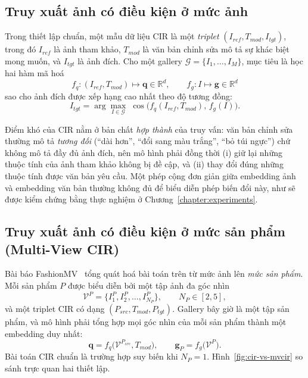 \subsection{Truy xuất ảnh có điều kiện ở mức ảnh}

Trong thiết lập chuẩn, một mẫu dữ liệu CIR là một \emph{triplet} $(I_{ref}, T_{mod}, I_{tgt})$, trong đó $I_{ref}$ là ảnh tham khảo, $T_{mod}$ là văn bản chỉnh sửa mô tả sự khác biệt mong muốn, và $I_{tgt}$ là ảnh đích. Cho một gallery $\mathcal{G} = \{I_1, \dots, I_M\}$, mục tiêu là học hai hàm mã hoá
\begin{equation}
    f_q : (I_{ref}, T_{mod}) \mapsto \mathbf{q} \in \mathbb{R}^d, \qquad f_g : I \mapsto \mathbf{g} \in \mathbb{R}^d
\end{equation}
sao cho ảnh đích được xếp hạng cao nhất theo độ tương đồng:
\begin{equation}
    I_{tgt} = \arg\max_{I \in \mathcal{G}} \; \cos\big(f_q(I_{ref}, T_{mod}),\, f_g(I)\big).
    \label{eq:cir-objective}
\end{equation}

Điểm khó của CIR nằm ở bản chất \emph{hợp thành} của truy vấn: văn bản chỉnh sửa thường mô tả \emph{tương đối} (``dài hơn'', ``đổi sang màu trắng'', ``bỏ túi ngực'') chứ không mô tả đầy đủ ảnh đích, nên mô hình phải đồng thời (i) giữ lại những thuộc tính của ảnh tham khảo không bị đề cập, và (ii) thay đổi đúng những thuộc tính được văn bản yêu cầu. Một phép cộng đơn giản giữa embedding ảnh và embedding văn bản thường không đủ để biểu diễn phép biến đổi này, như sẽ được kiểm chứng bằng thực nghiệm ở Chương~\ref{chapter:experiments}.

\subsection{Truy xuất ảnh có điều kiện ở mức sản phẩm (Multi-View CIR)}

Bài báo FashionMV~\cite{yuan2026fashionmv} tổng quát hoá bài toán trên từ mức ảnh lên \emph{mức sản phẩm}. Mỗi sản phẩm $P$ được biểu diễn bởi một tập ảnh đa góc nhìn
\begin{equation}
    \mathcal{V}^P = \{I^P_1, I^P_2, \dots, I^P_{N_P}\}, \qquad N_P \in [2, 5],
\end{equation}
và một triplet CIR có dạng $(P_{src}, T_{mod}, P_{tgt})$. Gallery bây giờ là một tập sản phẩm, và mô hình phải tổng hợp mọi góc nhìn của mỗi sản phẩm thành một embedding duy nhất:
\begin{equation}
    \mathbf{q} = f_q\big(\mathcal{V}^{P_{src}}, T_{mod}\big), \qquad \mathbf{g}_P = f_g\big(\mathcal{V}^{P}\big).
\end{equation}
Bài toán CIR chuẩn là trường hợp suy biến khi $N_P = 1$. Hình~\ref{fig:cir-vs-mvcir} so sánh trực quan hai thiết lập.

